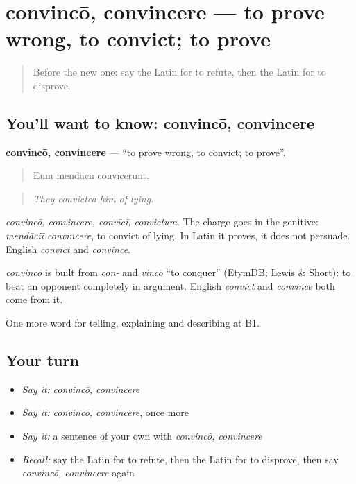 \section[convincō, convincere]{convincō, convincere — to prove wrong, to convict; to prove}

\label{lesson:LA-C362-convinco}



\begin{quote}
Before the new one: say the Latin for to refute, then the Latin for to disprove.
\end{quote}

\subsection*{You'll want to know: convincō, convincere}
\textbf{convincō, convincere} — \textquotedblleft{}to prove wrong, to convict; to prove\textquotedblright{}.

\begin{quote}
Eum mendāciī convīcērunt.
\end{quote}

\begin{quote}
\emph{They convicted him of lying.}
\end{quote}

\emph{convincō, convincere, convīcī, convictum}. The charge goes in the genitive: \emph{mendāciī convincere}, to convict of lying. In Latin it proves, it does not persuade. English \emph{convict} and \emph{convince}.

\begin{cousinweb}
\emph{convincō} is built from \emph{con-} and \emph{vincō} \textquotedblleft{}to conquer\textquotedblright{} (EtymDB; Lewis \& Short): to beat an opponent completely in argument. English \emph{convict} and \emph{convince} both come from it.
\end{cousinweb}

\begin{grammarlens}[title={What you've built}]
One more word for telling, explaining and describing at B1.
\end{grammarlens}

\subsection*{Your turn}
\begin{itemize}
\raggedright
  \item \emph{Say it:} \emph{convincō, convincere}
  \item \emph{Say it:} \emph{convincō, convincere}, once more
  \item \emph{Say it:} a sentence of your own with \emph{convincō, convincere}
  \item \emph{Recall:} say the Latin for to refute, then the Latin for to disprove, then say \emph{convincō, convincere} again
\end{itemize}

